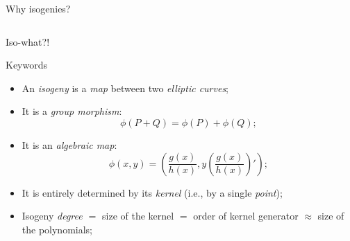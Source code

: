 \documentclass[aspectratio=169]{beamer}
\begin{document}
\begin{frame}{Why isogenies?}
\begin{columns}
\begin{column}{0.45\textwidth}
\begin{overlayarea}{0.8\textwidth}{\textheight}
\begin{onlyenv}
      \end{onlyenv}
    \end{overlayarea}
  \end{column}
  \end{columns}
\end{frame}


\begin{frame}{Iso-what?!}
  \begin{block}{Keywords}
    \begin{itemize}
    \item<1-> An \emph{isogeny} is a \emph{map} between two
      \emph{elliptic curves};
    \item<2-> It is a \emph{group morphism}:
      \[ϕ(P+Q) = ϕ(P)+ϕ(Q);\]
    \item<3-> It is an \emph{algebraic map}:
      \[ϕ(x,y) = \left( \frac{g(x)}{h(x)}, y\left(\frac{g(x)}{h(x)}\right)' \right);\]
    \item<4-> It is entirely determined by its \emph{kernel} (i.e., by a single \emph{point});
    \item<5-> Isogeny \emph{degree $=$} size of the kernel \emph{$=$}
      order of kernel generator \emph{$\approx$} size of the polynomials;
    \end{itemize}
  \end{block}
\end{frame}

\end{document}
